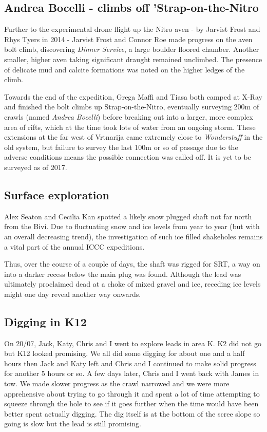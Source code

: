 \subsection{Andrea Bocelli - climbs off 'Strap-on-the-Nitro}
Further to the experimental drone flight up the Nitro aven - by Jarvist Frost and Rhys Tyers in 2014 - Jarvist Frost and Connor Roe made progress on the aven bolt climb, discovering \emph{Dinner Service}, a large boulder floored chamber. Another smaller, higher aven taking significant draught remained unclimbed. The presence of delicate mud and calcite formations was noted on the higher ledges of the climb.

Towards the end of the expedition, Grega Maffi and Tiasa both camped at X-Ray and finished the bolt climbs up Strap-on-the-Nitro, eventually surveying 200m of crawls (named \emph{Andrea Bocelli}) before breaking out into a larger, more complex area of rifts, which at the time took lots of water from an ongoing storm. These extensions at the far west of Vrtnarija came extremely close to \emph{Wonderstuff} in the old system, but failure to survey the last 100m or so of passage due to the adverse conditions means the possible connection was called off. It is yet to be surveyed as of 2017.

\subsection{Surface exploration}
Alex Seaton and Cecilia Kan spotted a likely snow plugged shaft not far north from the Bivi. Due to fluctuating snow and ice levels from year to year (but with an overall decreasing trend), the investigation of such ice filled shakeholes remains a vital part of the annual ICCC expeditions. 

Thus, over the course of a couple of days, the shaft was rigged for SRT, a way on into a darker recess below the main plug was found. Although the lead was ultimately proclaimed dead at a choke of mixed gravel and ice, receding ice levels might one day reveal another way onwards. 

\subsection{Digging in K12}

On 20/07, Jack, Katy, Chris and I went to explore leads in area K. K2 did not go but K12 looked promising.  We all did some digging for about one and a half hours then Jack and Katy left and Chris and I continued to make solid progress for another 5 hours or so. A few days later, Chris and I went back with James in tow. We made slower progress as the crawl narrowed and we were more apprehensive about trying to go through it and spent a lot of time attempting to squeeze through the hole to see if it goes further when the time would have been better spent actually digging. The dig itself is at the bottom of the scree slope so going is slow but the lead is still promising. 

